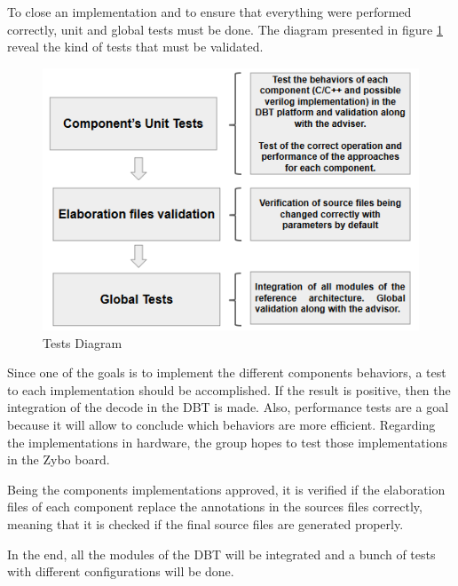 To close an implementation and to ensure that everything were performed correctly, unit and global tests must be done. The diagram presented in figure \ref{fig:tests} reveal the kind of tests that must be validated. 

\begin{figure}[H]
\centerline{
\includegraphics[scale=0.8]{images/TestCases.png}
}
\caption{Tests Diagram}
\label{fig:tests} 
\end{figure}

Since one of the goals is to implement the different components behaviors, a test to each implementation should be accomplished. If the result is positive, then the integration  of the decode in the DBT is made. Also, performance tests are a goal because it will allow to conclude which behaviors are more efficient. Regarding the implementations in hardware, the group hopes to test those implementations in the Zybo board.

Being the components implementations approved, it is verified if the elaboration files of each component replace the annotations in the sources files correctly, meaning that it is checked if the final source files are generated properly.

In the end, all the modules of the DBT will be integrated and a bunch of tests with different configurations will be done.
